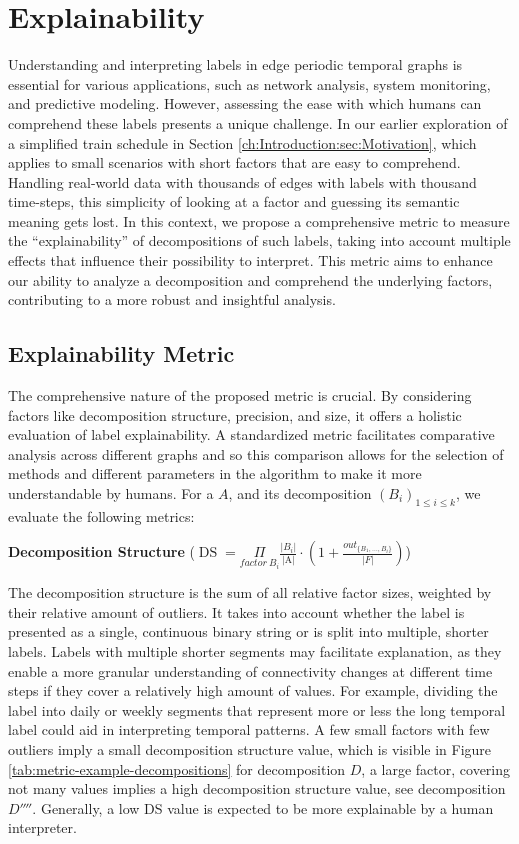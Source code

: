 \chapter{Explainability}
Understanding and interpreting labels in edge periodic temporal graphs is essential for various applications, such as network analysis, system monitoring, and predictive modeling.
However, assessing the ease with which humans can comprehend these labels presents a unique challenge.
In our earlier exploration of a simplified train schedule in Section \ref{ch:Introduction:sec:Motivation}, which applies to small scenarios with short factors that are easy to comprehend.
Handling real-world data with thousands of edges with labels with thousand time-steps, this simplicity of looking at a factor and guessing its semantic meaning gets lost.
In this context, we propose a comprehensive metric to measure the \enquote{explainability} of decompositions of such labels, taking into account multiple effects that influence their possibility to interpret.
This metric aims to enhance our ability to analyze a decomposition and comprehend the underlying factors, contributing to a more robust and insightful analysis.

\section{Explainability Metric}
The comprehensive nature of the proposed metric is crucial.
By considering factors like decomposition structure, precision, and size, it offers a holistic evaluation of label explainability.
A standardized metric facilitates comparative analysis across different graphs and so this comparison allows for the selection of methods and different parameters in the algorithm to make it more understandable by humans.
For a \DFA $A$, and its decomposition $(B_i)_{1 \leq i \leq k}$, we evaluate the following metrics:

\textbf{Decomposition Structure} ($\operatorname{DS} =  \underset{factor~ B_i}{\Pi}\frac{|B_i|}{\text{|A|}} \cdot (1 + \frac{out_{\{B_1,\dots,B_i\}}}{|F|})$)

The decomposition structure is the sum of all relative factor sizes, weighted by their relative amount of outliers.
It takes into account whether the label is presented as a single, continuous binary string or is split into multiple, shorter labels.
Labels with multiple shorter segments may facilitate explanation, as they enable a more granular understanding of connectivity changes at different time steps if they cover a relatively high amount of values.
For example, dividing the label into daily or weekly segments that represent more or less the long temporal label could aid in interpreting temporal patterns.
A few small factors with few outliers imply a small decomposition structure value, which is visible in Figure \ref{tab:metric-example-decompositions} for decomposition $D$, a large factor, covering not many values implies a high decomposition structure value, see decomposition $D''''$.
Generally, a low DS value is expected to be more explainable by a human interpreter. 

